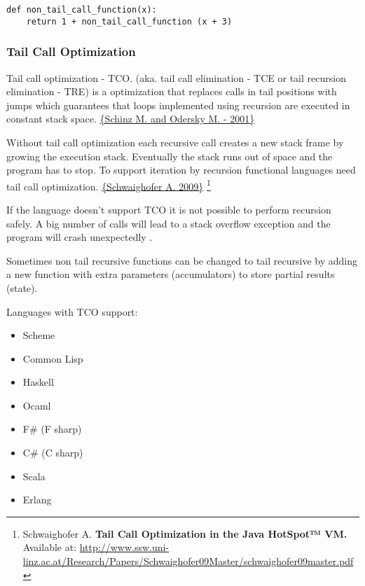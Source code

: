 \documentclass[11pt]{article}
\begin{document}
\begin{verbatim}
def non_tail_call_function(x):
    return 1 + non_tail_call_function (x + 3)
\end{verbatim}

\subsubsection{Tail Call Optimization}
\label{sec-1-8-2}

Tail call optimization - TCO. (aka. tail call elimination - TCE or
tail recursion elimination - TRE) is a optimization that replaces
calls in tail positions with jumps which guarantees that loops
implemented using recursion are executed in constant stack
space. \href{http://citeseerx.ist.psu.edu/viewdoc/download?doi\%3D10.1.1.98.1934&rep\%3Drep1&type\%3Dpdf}{\{Schinz M. and Odersky M. - 2001\}} 

Without tail call optimization each recursive call creates a
new stack frame by growing the execution stack. Eventually the
stack runs out of space and the program has to stop.  To support
iteration by recursion functional languages need tail call
optimization. \href{http://www.ssw.uni-linz.ac.at/Research/Papers/Schwaighofer09Master/schwaighofer09master.pdf}{\{Schwaighofer A. 2009\}}  \footnote{Schwaighofer A. \textbf{Tail Call Optimization in the
Java HotSpot™ VM.} Available at:  \url{http://www.ssw.uni-linz.ac.at/Research/Papers/Schwaighofer09Master/schwaighofer09master.pdf}}

If the language doesn't support TCO it is not possible to perform
recursion safely. A big number of calls will lead to a stack overflow
exception and the program will crash unexpectedly .

Sometimes non tail recursive functions can be changed to tail
recursive by adding a new function with extra parameters
(accumulators) to store partial results (state).

Languages with TCO support: 

\begin{itemize}
\item Scheme
\item Common Lisp
\item Haskell
\item Ocaml
\item F\# (F sharp)
\item C\# (C sharp)
\item Scala
\item Erlang
\end{itemize}
\end{document}
